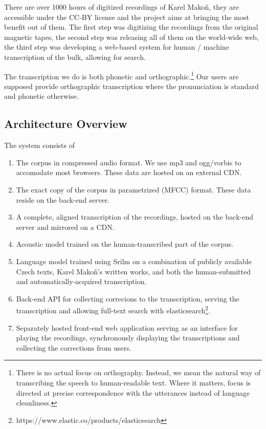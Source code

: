\documentclass{itatnew}
\begin{document}
There are over 1000 hours of digitized recordings of Karel Makoň, they are
accessible under the CC-BY license and the project aims at bringing the most
benefit out of them. The first step was digitizing the recordings from the
original magnetic tapes, the second step was releasing all of them on the
world-wide web, the third step was developing a web-based system for human /
machine transcription of the bulk, allowing for search.

The transcription we do is both phonetic and orthographic.\footnote{There is no
actual focus on orthography. Instead, we mean the natural way of transcribing the
speech to human-readable text. Where it matters, focus is directed at precise
correspondence with the utterances instead of language cleanliness.} Our users
are supposed provide orthographic transcription where the pronunciation is
standard and phonetic otherwise.

\subsection{Architecture Overview}

The system consists of

\begin{enumerate}
\item{
    The corpus in compressed audio format. We use mp3 and ogg/vorbis to
    accomodate most browsers.  These data are hosted on an external CDN.
}
\item{
    The exact copy of the corpus in parametrized (MFCC) format. These data
    reside on the back-end server.
}
\item{
    A complete, aligned transcription of the recordings, hosted on the back-end
    server and mirrored on a CDN.
}
\item{
    Acoustic model trained on the human-transcribed part of the corpus.
}
\item{
    Language model trained using Srilm\cite{stolcke2002srilm} on a combination
    of publicly available Czech texts, Karel Makoň's written works, and both the
    human-submitted and automatically-acquired transcription.
}
\item{
    Back-end API for collecting correcions to the transcription, serving the
    transcription and allowing full-text search with
    elasticsearch\footnote{https://www.elastic.co/products/elasticsearch}.
}
\item{
    Separately hosted front-end web application serving as an interface for
    playing the recordings, synchronously displaying the transcriptions and
    collecting the corrections from users.
}
\end{enumerate}
\end{document}
